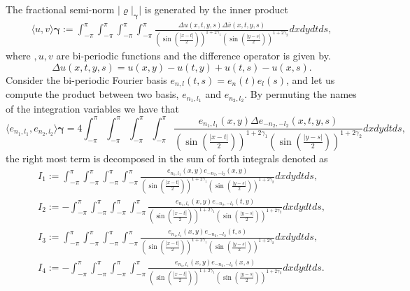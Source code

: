 \documentclass{article}
\begin{document}
The fractional semi-norm $|\varrho|_{\mathbf{\gamma}}|$ is generated by the inner product 
\begin{align*}
\langle u , v \rangle{\mathbf{\gamma}} := \int_{-\pi}^{\pi}  \int_{-\pi}^{\pi} \int_{-\pi}^{\pi}\int_{-\pi}^{\pi} \frac{\Delta u (x,t,y,s)\Delta \overline{v} (x,t,y,s) }
{\left(\sin\left(\frac{|x-t|}{2}\right)\right)^{1+2\gamma_1}\left(\sin\left(\frac{|y-s|}{2}\right)\right)^{1+2\gamma_2}}dx dy dt ds, 
\end{align*}
where $,u,v$ are bi-periodic functions and the difference operator is given by.
$$\Delta u(x,t,y,s) = u(x,y)-u(t,y)+u(t,s)-u(x,s).$$
Consider the bi-periodic Fourier basis 
$e_{n,l}(t,s) = e_n(t)e_l(s)$, and let us compute the product between two basis, $e_{n_1,l_1}$ and $e_{n_2,l_2}$.  By permuting the names of the integration variables we have that 
$$\langle e_{n_1,l_1} , e_{n_2,l_2} \rangle{\mathbf{\gamma}}  =
4 \int_{-\pi}^{\pi}  \int_{-\pi}^{\pi} \int_{-\pi}^{\pi}\int_{-\pi}^{\pi} \frac{e_{n_1,l_1}(x,y)\Delta e_{-n_2,-l_2} (x,t,y,s) }
{\left(\sin\left(\frac{|x-t|}{2}\right)\right)^{1+2\gamma_1}\left(\sin\left(\frac{|y-s|}{2}\right)\right)^{1+2\gamma_2}}dx dy dt ds, 
$$
the right most term is decomposed in the sum of forth integrals denoted as
\begin{align*}
I_1 := \int_{-\pi}^{\pi}\int_{-\pi}^{\pi} \int_{-\pi}^{\pi}\int_{-\pi}^{\pi} \frac{e_{n_1,l_1}(x,y)e_{-n_2,-l_2} (x,y) }
{\left(\sin\left(\frac{|x-t|}{2}\right)\right)^{1+2\gamma_1}\left(\sin\left(\frac{|y-s|}{2}\right)\right)^{1+2\gamma_2}}dx dy dt ds,\\
I_2 :=  -\int_{-\pi}^{\pi}\int_{-\pi}^{\pi} \int_{-\pi}^{\pi}\int_{-\pi}^{\pi} \frac{e_{n_1,l_1}(x,y)e_{-n_2,-l_2} (t,y) }
{\left(\sin\left(\frac{|x-t|}{2}\right)\right)^{1+2\gamma_1}\left(\sin\left(\frac{|y-s|}{2}\right)\right)^{1+2\gamma_2}}dx dy dt ds,\\
I_3 := \int_{-\pi}^{\pi}\int_{-\pi}^{\pi} \int_{-\pi}^{\pi}\int_{-\pi}^{\pi} \frac{e_{n_1,l_1}(x,y)e_{-n_2,-l_2} (t,s) }
{\left(\sin\left(\frac{|x-t|}{2}\right)\right)^{1+2\gamma_1}\left(\sin\left(\frac{|y-s|}{2}\right)\right)^{1+2\gamma_2}}dx dy dt ds,\\
I_4 := -\int_{-\pi}^{\pi}\int_{-\pi}^{\pi} \int_{-\pi}^{\pi}\int_{-\pi}^{\pi} \frac{e_{n_1,l_1}(x,y)e_{-n_2,-l_2} (x,s) }
{\left(\sin\left(\frac{|x-t|}{2}\right)\right)^{1+2\gamma_1}\left(\sin\left(\frac{|y-s|}{2}\right)\right)^{1+2\gamma_2}}dx dy dt ds.
\end{align*}
\end{document}
